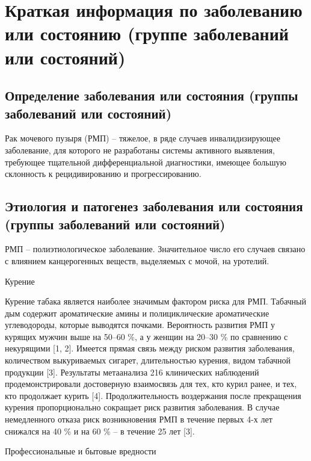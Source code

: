 \section{Краткая информация по заболеванию или состоянию (группе заболеваний или состояний)}
\label{sec:1}

\subsection{Определение заболевания или состояния (группы заболеваний или состояний)}
\label{sec:}
Рак мочевого пузыря (РМП) – тяжелое, в ряде случаев инвалидизирующее заболевание, для которого не разработаны системы активного выявления, требующее тщательной дифференциальной диагностики, имеющее большую склонность к рецидивированию и прогрессированию.

\subsection{Этиология и патогенез заболевания или состояния (группы заболеваний или состояний)}
\label{sec:}
РМП – полиэтиологическое заболевание. Значительное число его случаев связано с влиянием канцерогенных веществ, выделяемых с мочой, на уротелий.

Курение

Курение табака является наиболее значимым фактором риска для РМП. Табачный дым содержит ароматические амины и полициклические ароматические углеводороды, которые выводятся почками. Вероятность развития РМП у курящих мужчин выше на 50–60 \%, а у женщин на 20–30 \% по сравнению с некурящими [1, 2]. Имеется прямая связь между риском развития заболевания, количеством выкуриваемых сигарет, длительностью курения, видом табачной продукции [3]. Результаты метаанализа 216 клинических наблюдений продемонстрировали достоверную взаимосвязь для тех, кто курил ранее, и тех, кто продолжает курить [4]. Продолжительность воздержания после прекращения курения пропорционально сокращает риск развития заболевания. В случае немедленного отказа риск возникновения РМП в течение первых 4-х лет снижался на 40 \% и на 60 \% – в течение 25 лет [3].

Профессиональные и бытовые вредности

